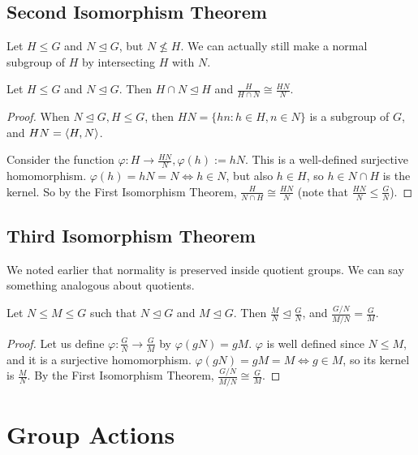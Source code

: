 \documentclass{article}
\begin{document}
\subsection{Second Isomorphism Theorem}
Let $H\leq G$ and $N\trianglelefteq G$, but $N \nleq H$. We can actually still make a normal subgroup of $H$ by intersecting $H$ with $N$.
\begin{theorem}
    Let $H \leq G$ and $N \trianglelefteq G$. Then $H \cap N \trianglelefteq H$ and $\frac{H}{H \cap N} \cong \frac{HN}{N}$.
\end{theorem}
\begin{proof}
    When $N \trianglelefteq G, H \leq G$, then $HN = \{ hn: h \in H, n \in N \}$ is a subgroup of $G$, and $HN = \langle H, N \rangle$.

    Consider the function $\varphi: H \to \frac{HN}{N}, \varphi(h) := hN$. This is a well-defined surjective homomorphism. $\varphi(h) = hN = N \iff h \in N$, but also $h \in H$, so $h \in N \cap H$ is the kernel. So by the First Isomorphism Theorem, $\frac{H}{N \cap H} \cong \frac{HN}{N}$ (note that $\frac{HN}{N} \leq \frac{G}{N}$).
\end{proof}

\subsection{Third Isomorphism Theorem}
We noted earlier that normality is preserved inside quotient groups. We can say something analogous about quotients.
\begin{theorem}
    Let $N \leq M \leq G$ such that $N \trianglelefteq G$ and $M \trianglelefteq G$. Then $\frac{M}{N} \trianglelefteq \frac{G}{N}$, and $\frac{G/N}{M/N} = \frac{G}{M}$.
\end{theorem}
\begin{proof}
    Let us define $\varphi: \frac{G}{N} \to \frac{G}{M}$ by $\varphi(gN) = gM$. $\varphi$ is well defined since $N \leq M$, and it is a surjective homomorphism. $\varphi(gN) = gM = M \iff g \in M$, so its kernel is $\frac{M}{N}$. By the First Isomorphism Theorem, $\frac{G/N}{M/N} \cong \frac{G}{M}$.
\end{proof}

\section{Group Actions}
\end{document}
